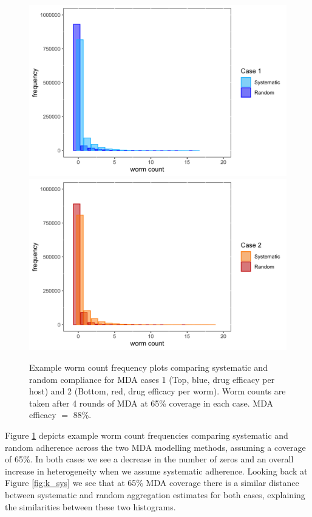 \begin{figure}[h]
\begin{center}
\includegraphics[width=12.5cm]{Project/Figures/Aggregation/Case1Hist.png}\\
\includegraphics[width=12.5cm]{Project/Figures/Aggregation/Case2Hist.png}
\caption[Worm count frequency distributions.]{Example worm count frequency plots comparing systematic and random compliance for MDA cases 1 (Top, blue, drug efficacy per host) and 2 (Bottom, red, drug efficacy per worm). Worm counts are taken after 4 rounds of MDA at 65\% coverage in each case. MDA efficacy $=$ 88\%.}
\label{fig:kHist}
\end{center}
\end{figure}

Figure \ref{fig:kHist} depicts example worm count frequencies comparing systematic and random adherence across the two MDA modelling methods, assuming a coverage of 65\%. In both cases we see a decrease in the number of zeros and an overall increase in heterogeneity when we assume systematic adherence. Looking back at Figure \ref{fig:k_sys} we see that at 65\% MDA coverage there is a similar distance between systematic and random aggregation estimates for both cases, explaining the similarities between these two histograms.

